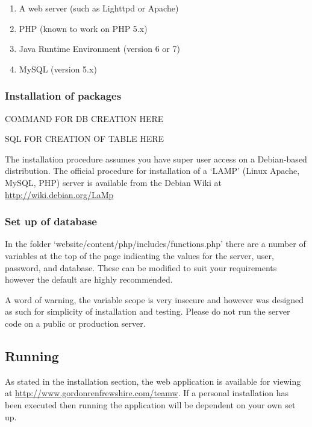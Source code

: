 \begin{enumerate}
\item A web server (such as Lighttpd or Apache)
\item PHP (known to work on PHP 5.x)
\item Java Runtime Environment (version 6 or 7)
\item MySQL (version 5.x)
\end{enumerate}

\subsubsection{Installation of packages}

COMMAND FOR DB CREATION HERE

SQL FOR CREATION OF TABLE HERE

The installation procedure assumes you have super user access on a Debian-based
distribution. The official procedure for installation of a `LAMP' (Linux
Apache, MySQL, PHP) server is available from the Debian Wiki at
\url{http://wiki.debian.org/LaMp}

\subsubsection{Set up of database}

In the folder `website/content/php/includes/functions.php' there are a number
of variables at the top of the page indicating the values for the server, user,
password, and database. These can be modified to suit your requirements however
the default are highly recommended.

A word of warning, the variable scope is very insecure and however was designed
as such for simplicity of installation and testing. Please do not run the server
code on a public or production server.

\subsection{Running}

As stated in the installation section, the web application is available for
viewing at \url{http://www.gordonrenfrewshire.com/teamw}. If a personal
installation has been executed then running the application will be dependent
on your own set up.